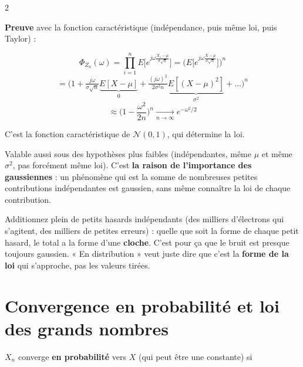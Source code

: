 \documentclass[a4paper,9pt]{extarticle}
\begin{document}
\begin{multicols}{2}
\begin{important}

\textbf{Preuve} avec la fonction caractéristique (indépendance, puis même loi, puis Taylor) :

\[
\Phi_{Z_n}(\omega) = \prod_{i=1}^n E\Big[e^{j\omega\frac{X_i - \mu}{\sigma\sqrt n}}\Big] =
\Big(E\Big[e^{j\omega\frac{X - \mu}{\sigma\sqrt n}}\Big]\Big)^n
\]
\[
= \Big(1 + \tfrac{j\omega}{\sigma\sqrt n}\underbrace{E[X-\mu]}_{0} + \tfrac{(j\omega)^2}{2\sigma^2
n}\underbrace{E[(X-\mu)^2]}_{\sigma^2} + \dots\Big)^n
\]
\[
\approx \Big(1 - \frac{\omega^2}{2n}\Big)^n \xrightarrow[n\to\infty]{} e^{-\omega^2/2}
\]

C'est la fonction caractéristique de $\mathcal N(0,1)$, qui détermine la loi.

\end{important}


\begin{important}

Valable aussi sous des hypothèses plus faibles (indépendantes, même $\mu$ et même $\sigma^2$,
pas forcément même loi). C'est \textbf{la raison de l'importance des gaussiennes} : un
phénomène qui est la somme de nombreuses petites contributions indépendantes est gaussien, sans
même connaître la loi de chaque contribution.

\end{important}


\begin{simple}

Additionnez plein de petits hasards indépendants (des milliers d'électrons qui s'agitent, des
milliers de petites erreurs) : quelle que soit la forme de chaque petit hasard, le total a la
forme d'une \textbf{cloche}. C'est pour ça que le bruit est presque toujours gaussien. « En
distribution » veut juste dire que c'est la \textbf{forme de la loi} qui s'approche, pas les
valeurs tirées.

\end{simple}


\section{Convergence en probabilité et loi des grands nombres}


\begin{definition}

$X_n$ converge \textbf{en probabilité} vers $X$ (qui peut être une constante) si


\end{definition}
\end{multicols}
\end{document}
